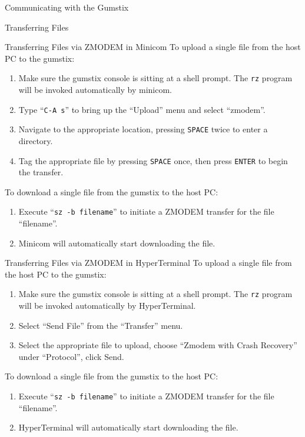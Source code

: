 \documentclass{article}
\begin{document}
\begin{section}{Communicating with the Gumstix}
\begin{subsection}{Transferring Files}
			\begin{subsubsection}{Transferring Files via ZMODEM in Minicom}
				To upload a single file from the host PC to the gumstix:
				\begin{enumerate}
					\item Make sure the gumstix console is sitting at a shell prompt.  The
					      \texttt{rz} program will be invoked automatically by minicom.
					\item Type ``\verb|C-A s|'' to bring up the ``Upload'' menu and select
					      ``zmodem''.
					\item Navigate to the appropriate location, pressing \texttt{SPACE} twice
					      to enter a directory.
					\item Tag the appropriate file by pressing \texttt{SPACE} once, then press
					      \texttt{ENTER} to begin the transfer.
				\end{enumerate}
				To download a single file from the gumstix to the host PC:
				\begin{enumerate}
					\item Execute ``\verb|sz -b filename|'' to initiate a ZMODEM transfer for
					      the file ``filename''.
					\item Minicom will automatically start downloading the file.
				\end{enumerate}
			\end{subsubsection}

			\begin{subsubsection}{Transferring Files via ZMODEM in HyperTerminal}
				To upload a single file from the host PC to the gumstix:
				\begin{enumerate}
					\item Make sure the gumstix console is sitting at a shell prompt.  The
					      \texttt{rz} program will be invoked automatically by HyperTerminal.
					\item Select ``Send File'' from the ``Transfer'' menu.
					\item Select the appropriate file to upload, choose ``Zmodem with Crash
					      Recovery'' under ``Protocol'', click Send.
				\end{enumerate}
				To download a single file from the gumstix to the host PC:
				\begin{enumerate}
					\item Execute ``\verb|sz -b filename|'' to initiate a ZMODEM transfer for
					      the file ``filename''.
					\item HyperTerminal will automatically start downloading the file.
				\end{enumerate}
			\end{subsubsection}


\end{subsection}
\end{section}
\end{document}
